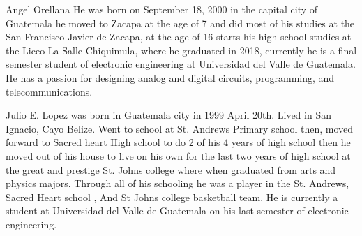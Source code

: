 \begin{IEEEbiography}{Angel Orellana}
He was born on September 18, 2000 in the capital city of Guatemala
he moved to Zacapa at the age of 7 and did most of his studies at the
San Francisco Javier de Zacapa, at the age of 16 starts his high school studies at the
Liceo La Salle Chiquimula, where he graduated in 2018, currently
he is a final semester student of 
electronic engineering at Universidad del Valle 
de Guatemala. He has a passion for designing analog and digital circuits, 
programming, and telecommunications.
\end{IEEEbiography}
    
\begin{IEEEbiography}{Julio E. Lopez}
    was born in Guatemala city in 1999 April 20th. Lived in San Ignacio, Cayo Belize. Went to school at
    St. Andrews Primary school then, moved forward to Sacred heart High school to do 2 of
    his 4 years of high school then he moved out of his house to live on his own for the last
    two years of high school at the great and prestige St. Johns college where when graduated from
    arts and physics majors. Through all of his schooling he was a player in the St. Andrews, Sacred Heart school , And St Johns
    college basketball team. He is currently a student at Universidad del Valle de Guatemala on his last semester of electronic engineering.
\end{IEEEbiography}